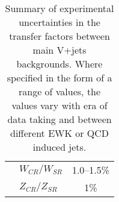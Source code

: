 \begin{table}[htbp]
\begin{center}
\begin{tabular}{llc}
                                & $W_{CR}/W_{SR}$               & 1.0--1.5\% \\
                                & $Z_{CR}/Z_{SR}$				& 1\% \\
       \hline
      \end{tabular}
    \end{center}
    \label{tab:systematics}
        \caption{Summary of experimental uncertainties in the transfer factors between main V+jets backgrounds. Where specified in the form of a range of values, the values vary with era of data taking and between different EWK or QCD induced jets.}
\end{table}